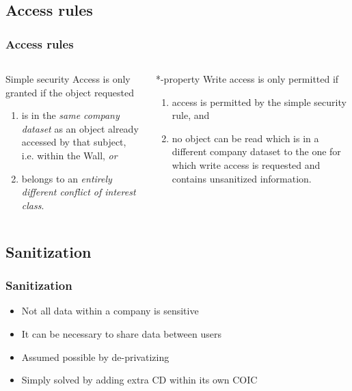 \documentclass[10pt]{beamer}
\begin{document}
\subsection{Access rules}
\begin{frame}
	\frametitle{Access rules}
	
	\begin{columns}
		\begin{column}{.45\textwidth}
			\begin{block}{Simple security}
				Access is only granted if the object requested
				\begin{enumerate}
					\item is in the \textit{same company dataset} as an object already accessed by that subject, i.e. within the Wall, \textit{or}
					\item belongs to an \textit{entirely different conflict of interest class}.
				\end{enumerate}
			\end{block}
		\end{column}
		\begin{column}{.45\textwidth}
			\begin{block}{*-property}
				Write access is only permitted if
				\begin{enumerate}
					\item access is permitted by the simple security rule, and
					\item no object can be read which is in a different company dataset to the one for which write access is requested and contains unsanitized information.
				\end{enumerate}
			\end{block}
		\end{column}
	\end{columns}
\end{frame}

\subsection{Sanitization}
\begin{frame}
	\frametitle{Sanitization}
	
	\begin{itemize}
		\item Not all data within a company is sensitive
		\item It can be necessary to share data between users
		\item Assumed possible by de-privatizing
		\item Simply solved by adding extra CD within its own COIC
	\end{itemize}
\end{frame}
\end{document}
